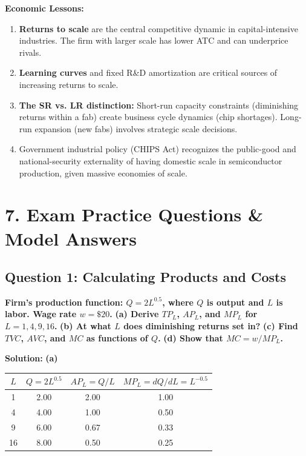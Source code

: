 \documentclass[10pt,a4paper]{article}
\begin{document}
\begin{multicols}{2}
\textbf{Economic Lessons:}
\begin{enumerate}[leftmargin=*,nosep]
    \item \textbf{Returns to scale} are the central competitive dynamic in capital-intensive industries. The firm with larger scale has lower ATC and can underprice rivals.
    \item \textbf{Learning curves} and fixed R\&D amortization are critical sources of increasing returns to scale.
    \item \textbf{The SR vs. LR distinction:} Short-run capacity constraints (diminishing returns within a fab) create business cycle dynamics (chip shortages). Long-run expansion (new fabs) involves strategic scale decisions.
    \item Government industrial policy (CHIPS Act) recognizes the public-good and national-security externality of having domestic scale in semiconductor production, given massive economies of scale.
\end{enumerate}

\section*{7. Exam Practice Questions \& Model Answers}

\subsection*{Question 1: Calculating Products and Costs}
\textbf{Firm's production function: $Q = 2L^{0.5}$, where $Q$ is output and $L$ is labor. Wage rate $w = \$20$.}
\textbf{(a) Derive $TP_L$, $AP_L$, and $MP_L$ for $L = 1, 4, 9, 16$.}
\textbf{(b) At what $L$ does diminishing returns set in?}
\textbf{(c) Find $TVC$, $AVC$, and $MC$ as functions of $Q$.}
\textbf{(d) Show that $MC = w / MP_L$.}

\vspace{0.1cm}
\textbf{Solution:}
\vspace{0.05cm}
\textbf{(a)}
\begin{tabular}{@{}c|c|c|c@{}}
\hline $L$ & $Q = 2L^{0.5}$ & $AP_L = Q/L$ & $MP_L = dQ/dL = L^{-0.5}$ \\
\hline 1 & 2.00 & 2.00 & 1.00 \\
4 & 4.00 & 1.00 & 0.50 \\
9 & 6.00 & 0.67 & 0.33 \\
16 & 8.00 & 0.50 & 0.25 \\
\hline
\end{tabular}


\end{multicols}
\end{document}
